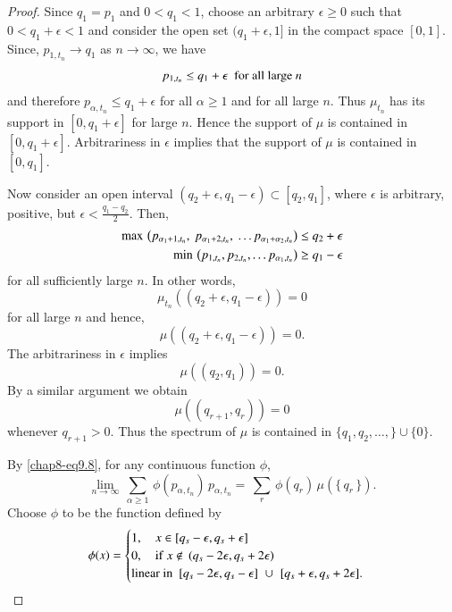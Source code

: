 \begin{proof}
Since $q_1=p_1$ and $0< q_1<1$, choose an arbitrary $\epsilon\geq 0$ such that $0<q_1+\epsilon<1$ and consider the open set $(q_1+\epsilon, 1]$ in the compact space $[0,1]$. Since, $p_{1, t_n}\rightarrow q_1$ as $n\rightarrow \infty$, we have 
$$  p_{1, t_n}\leq  q_1+\epsilon\ \ {\rm for \ all \ large}\ n$$
and therefore
$p_{\alpha,t_n}\leq q_1+\epsilon$ for all $\alpha\geq 1$ and for all large $n$. Thus $\mu_{t_n}$ has its support in $[0, q_1+\epsilon]$ for large $n$. Hence the support of $\mu$ is contained in $[0, q_1+\epsilon].$ Arbitrariness in $\epsilon$ implies that  the support of $\mu$ is contained in $[0,q_1]$. 

Now consider an open interval $(q_2+\epsilon, q_1-\epsilon)\subset 
[q_2,q_1]$, where $\epsilon$ is arbitrary, positive, but  $\epsilon <\frac{q_1-q_2}{2}$. Then, 
\begin{eqnarray*}
	{\rm max}\, \left(p_{\alpha_1+1,t_n},\ p_{\alpha_1+2,t_n},\ \ldots p_{\alpha_1+\alpha_2,t_n}\right)\leq q_2+ \epsilon \\ 
	{\rm min}\, \left(p_{1,t_n},p_{2,t_n},\ldots p_{\alpha_1,t_n}\right)\geq q_1 -\epsilon  
\end{eqnarray*}  
for all sufficiently large $n$. In other words, 
$$
\mu_{t_n}\left((q_2+\epsilon, q_1-\epsilon)\right)=0
$$
for all large $n$ and hence, 
$$
\mu\left((q_2+\epsilon, q_1-\epsilon)\right)=0.
$$
The arbitrariness in $\epsilon$ implies 
$$
\mu\left((q_2, q_1)\right)=0.
$$
By a similar argument we obtain 
$$
\mu\left((q_{r+1}, q_r)\right)=0
$$
whenever $q_{r+1}>0.$ Thus the spectrum of $\mu$ is contained in $\{q_1,q_2,\ldots , \} \cup \{0\}.$ 

By \eqref{chap8-eq9.8}, for any continuous function $\phi$, 
\begin{equation}
	\underset{n\rightarrow\infty}{\lim}\, \sum_{\alpha\geq 1}\, \phi(p_{\alpha, t_n})\, p_{\alpha, t_n}=\, \sum_{r}\, \phi(q_r)\, \mu\left( \{\,q_r\,\} \right). \label{chap8-eq9.15}
\end{equation} 
Choose $\phi$ to be the  function defined by    
\begin{equation}
	\phi(x)=
	\begin{cases}
	1, \quad   x\in [q_{s}-\epsilon, q_{s}+\epsilon] \\ 
		0,  \quad {\rm if\ } x\notin \, (q_{s}-2\epsilon, q_{s}+2\epsilon)  \\ 
		{\rm linear\ in}\ \   [q_{s}-2\epsilon, q_{s}-\epsilon]\,\,\cup\,\, [q_{s}+\epsilon, q_{s}+2\epsilon].
\end{cases}\label{chap8-eq9.16}
\end{equation} 


\end{proof}
